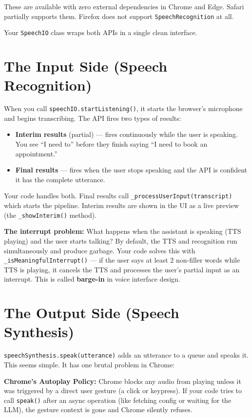\documentclass[12pt, a4paper]{report}
\newcommand{\ic}[1]{\texttt{\small\color{accentblue!70!black}#1}}
\begin{document}
These are available with zero external dependencies in Chrome and Edge. Safari partially
supports them. Firefox does not support \ic{SpeechRecognition} at all.

Your \ic{SpeechIO} class wraps both APIs in a single clean interface.

\section{The Input Side (Speech Recognition)}

When you call \ic{speechIO.startListening()}, it starts the browser's microphone and
begins transcribing. The API fires two types of results:

\begin{itemize}
  \item \textbf{Interim results} (partial) --- fires continuously while the user is
        speaking. You see ``I need to'' before they finish saying ``I need to book an
        appointment.''
  \item \textbf{Final results} --- fires when the user stops speaking and the API is
        confident it has the complete utterance.
\end{itemize}

Your code handles both. Final results call \ic{\_processUserInput(transcript)} which
starts the pipeline. Interim results are shown in the UI as a live preview (the
\ic{\_showInterim()} method).

\textbf{The interrupt problem:} What happens when the assistant is speaking (TTS playing)
and the user starts talking? By default, the TTS and recognition run simultaneously and
produce garbage. Your code solves this with \ic{\_isMeaningfulInterrupt()} --- if the
user says at least 2 non-filler words while TTS is playing, it cancels the TTS and
processes the user's partial input as an interrupt. This is called \textbf{barge-in} in
voice interface design.

\section{The Output Side (Speech Synthesis)}

\ic{speechSynthesis.speak(utterance)} adds an utterance to a queue and speaks it. This
seems simple. It has one brutal problem in Chrome:

\textbf{Chrome's Autoplay Policy:} Chrome blocks any audio from playing unless it was
triggered by a direct user gesture (a click or keypress). If your code tries to call
\ic{speak()} after an async operation (like fetching config or waiting for the LLM), the
gesture context is gone and Chrome silently refuses.
\end{document}
